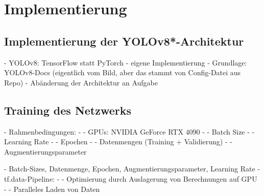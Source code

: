 
\section{Implementierung}
\label{sec:ki:implementierung}



\subsection{Implementierung der YOLOv8*-Architektur}
\label{sec:yolov8_implementierung}

- YOLOv8: TensorFlow statt PyTorch
- eigene Implementierung
- Grundlage: YOLOv8-Docs (eigentlich vom Bild, aber das stammt von Config-Datei aus Repo)
- Abänderung der Architektur an Aufgabe



\subsection{Training des Netzwerks}
\label{sec:training}

- Rahmenbedingungen:
- - GPUs: NVIDIA GeForce RTX 4090
- - Batch Size
- - Learning Rate
- - Epochen
- - Datenmengen (Training + Validierung)
- - Augmentierungsparameter

- Batch-Sizes, Datenmenge, Epochen, Augmentierungsparameter, Learning Rate
- tf.data-Pipeline:
- - Optimierung durch Auslagerung von Berechnungen auf GPU
- - Paralleles Laden von Daten

